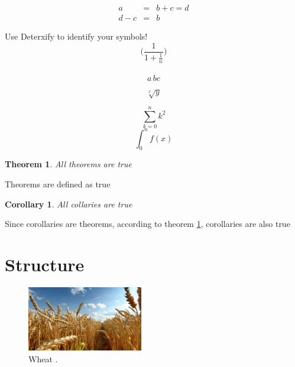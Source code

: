 \documentclass[a4paper]{report}
\begin{document}
\begin{eqnarray*}
a & = & b + c = d\\
d -c & = & b
\end{eqnarray*}

\noindent
Use Deterxify to identify your symbols! \\

$$\biggl(\frac{1}{1+\frac{1}{n}}\biggl)$$ \\

\[ a\,b\!c \] \cite{MIT}

$$\sqrt[x]{y}$$

$$ \sum_{k=0}^n k^2$$
$$ \int_{0}^n f(x)$$


\newtheorem{theorem}{Theorem}
\newtheorem{corollary}{Corollary}[section]
\begin{theorem}
\label{truth}
All theorems are true
\end{theorem}
Theorems are defined as true
\begin{corollary}
All collaries are true
\end{corollary}
Since corollaries are theorems, according to theorem \ref{truth}, corollaries are also true\\

\newpage

\chapter{Structure}

\begin{figure}
	
	\centering
	
	\includegraphics[width = 0.45\textwidth]{Wheat}
	\caption{Wheat \cite{Nature}.}
	
\end{figure}
\end{document}
